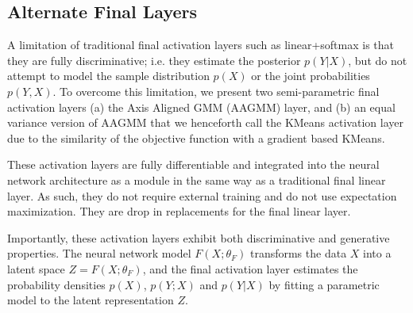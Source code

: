 \documentclass[10pt,twocolumn,letterpaper]{article}
\begin{document}


\subsection{Alternate Final Layers}

A limitation of traditional final activation layers such as linear+softmax is that they are fully discriminative; i.e. they estimate the posterior $p(Y|X)$, but do not attempt to model the sample distribution $p(X)$ or the joint probabilities $p(Y,X)$. 
To overcome this limitation, we present two semi-parametric final activation layers (a) the Axis Aligned GMM (AAGMM) layer, and (b) an equal variance version of AAGMM that we henceforth call the KMeans activation layer due to the similarity of the objective function with a gradient based KMeans.

These activation layers are fully differentiable and integrated into the neural network architecture as a module in the same way as a traditional final linear layer. 
As such, they do not require external training and do not use expectation maximization.
They are drop in replacements for the final linear layer.

Importantly, these activation layers exhibit both discriminative and generative properties. 
The neural network model $F(X;\theta_F)$ transforms the data $X$ into a latent space $Z = F(X;\theta_F)$, and the final activation layer estimates the probability densities $p(X)$, $p(Y;X)$ and $p(Y|X)$ by fitting a parametric model to the latent representation $Z$.
\end{document}
